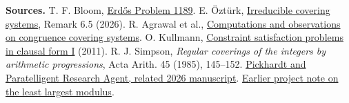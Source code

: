 \documentclass[11pt]{article}
\begin{document}
{\small\textbf{Sources.} T. F. Bloom, \href{https://www.erdosproblems.com/1189}{Erd\H{o}s Problem 1189}.
E. \"Ozt\"urk, \href{https://www.researchgate.net/publication/413884122}{Irreducible covering systems}, Remark 6.5 (2026).
R. Agrawal et al., \href{https://arxiv.org/abs/2208.09720}{Computations and observations on congruence covering systems}.
O. Kullmann, \href{https://doi.org/10.3233/FI-2011-428}{Constraint satisfaction problems in clausal form I} (2011).
R. J. Simpson, \emph{Regular coverings of the integers by arithmetic progressions}, Acta Arith. 45 (1985), 145--152.
\href{https://erdosproblems.ai/wiki/problems/covering_systems/E1189/claims/2026_07_28_pickhardt}{Pickhardt and Paratelligent Research Agent, related 2026 manuscript}.
\href{https://github.com/jpollard-cs/open-math-agents/tree/d174723fc6e80683cbf4d5bfe2020aa522ae32be/research/proof-manuscripts/covering-systems/fixed-cardinality}{Earlier project note on the least largest modulus}.}
\end{document}
